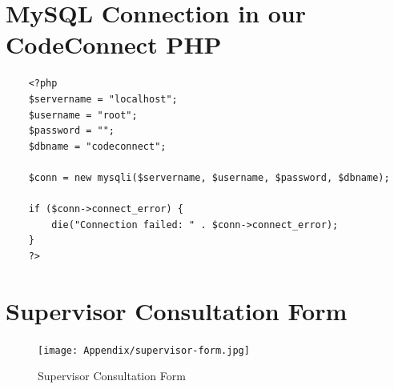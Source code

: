 \section{MySQL Connection in our CodeConnect PHP}
\vspace{1cm}
\begin{lstlisting}
    <?php
    $servername = "localhost";
    $username = "root";
    $password = "";
    $dbname = "codeconnect";

    $conn = new mysqli($servername, $username, $password, $dbname);

    if ($conn->connect_error) {
        die("Connection failed: " . $conn->connect_error);
    }
    ?>
    \end{lstlisting}

\section{Supervisor Consultation Form}
\begin{figure}[H]
    \centering
        \texttt{[image: Appendix/supervisor-form.jpg]}
    \caption{Supervisor Consultation Form}
\end{figure}